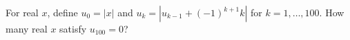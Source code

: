 For real $x$, define $u_0=|x|$ and $u_k=|u_{k-1}+(-1)^{k+1}k|$ for $k=1,\ldots,100$. How many real $x$ satisfy $u_{100}=0$?
